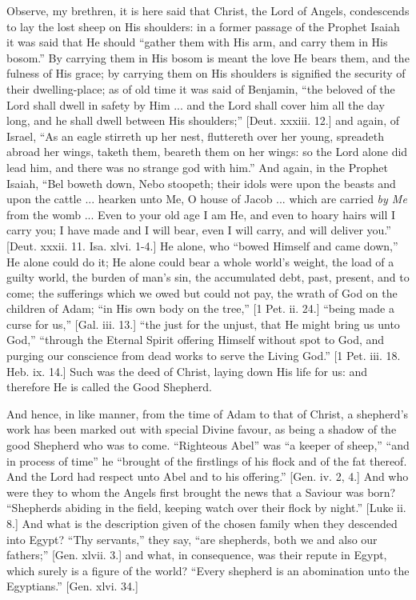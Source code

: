 Observe, my brethren, it is here said that Christ, the Lord of
Angels, condescends to lay the lost sheep on His shoulders: in a
former passage of the Prophet Isaiah it was said that He should
``gather them with His arm, and carry them in His bosom.'' By
carrying them in His bosom is meant the love He bears them, and the
fulness of His grace; by carrying them on His shoulders is signified
the security of their dwelling-place; as of old time it was said of
Benjamin, ``the beloved of the Lord shall dwell in safety by Him
... and the Lord shall cover him all the day long, and he shall dwell
between His shoulders;'' [Deut. xxxiii. 12.] and again, of Israel,
``As an eagle stirreth up her nest, fluttereth over her young,
spreadeth abroad her wings, taketh them, beareth them on her wings: so
the Lord alone did lead him, and there was no strange god with
him.'' And again, in the Prophet Isaiah, ``Bel boweth down,
Nebo stoopeth; their idols were upon the beasts and upon the cattle
... hearken unto Me, O house of Jacob ... which are carried \emph{by Me}
from the womb ... Even to your old age I am He, and even to hoary
hairs will I carry you; I have made and I will bear, even I will
carry, and will deliver you.'' [Deut. xxxii. 11. Isa. xlvi. 1-4.]
He alone, who ``bowed Himself and came down,'' He alone could
do it; He alone could bear a whole world's weight, the load of a
guilty world, the burden of man's sin, the accumulated debt, past,
present, and to come; the sufferings which we owed but could not pay,
the wrath of God on the children of Adam; ``in His own body on the
tree,'' [1 Pet. ii. 24.] ``being made a curse for us,''
[Gal. iii. 13.] ``the just for the unjust, that He might bring us
unto God,'' ``through the Eternal Spirit offering Himself
without spot to God, and purging our conscience from dead works to
serve the Living God.'' [1 Pet. iii. 18. Heb. ix. 14.] Such was
the deed of Christ, laying down His life for us: and therefore He is
called the Good Shepherd.

And hence, in like manner, from the time of Adam to that of Christ,
a shepherd's work has been marked out with special Divine favour, as
being a shadow of the good Shepherd who was to come. ``Righteous
Abel'' was ``a keeper of sheep,'' ``and in process of
time'' he ``brought of the firstlings of his flock and of the
fat thereof. And the Lord had respect unto Abel and to his
offering.'' [Gen. iv. 2, 4.] And who were they to whom the Angels
first brought the news that a Saviour was born? ``Shepherds
abiding in the field, keeping watch over their flock by night.''
[Luke ii. 8.] And what is the description given of the chosen family
when they descended into Egypt? ``Thy servants,'' they say,
``are shepherds, both we and also our fathers;'' [Gen. xlvii.
3.] and what, in consequence, was their repute in Egypt, which surely
is a figure of the world? ``Every shepherd is an abomination unto
the Egyptians.'' [Gen. xlvi. 34.]

